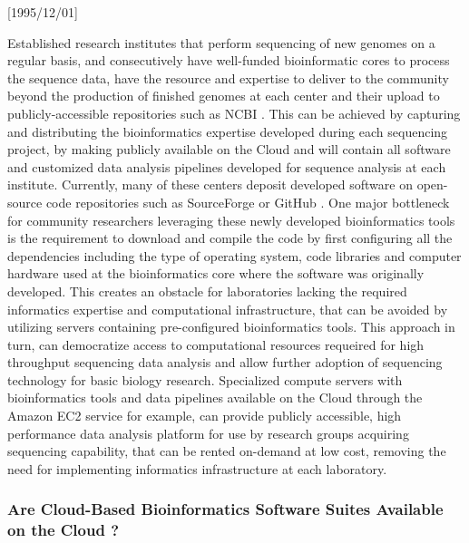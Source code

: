 \NeedsTeXFormat{LaTeX2e}[1995/12/01] \documentclass[10pt]{bmc_article}
\newenvironment{bmcformat}{\begin{raggedright}\baselineskip20pt\sloppy\setboolean{publ}{false}}{\end{raggedright}\baselineskip20pt\sloppy}
\begin{document}
\begin{bmcformat}
Established research institutes that perform sequencing of new genomes on a regular basis, and consecutively have
well-funded bioinformatic cores to process the sequence data, have the resource and expertise to deliver to the community 
beyond the production of finished genomes at each center and their upload to publicly-accessible repositories such as 
NCBI \cite{Pruitt2009}. This can be achieved by capturing and distributing the bioinformatics expertise developed during each
sequencing project, by making publicly available on the Cloud and will contain all software and customized data analysis
pipelines developed for sequence analysis at each institute. Currently, many of these centers deposit developed 
software on open-source code repositories such as SourceForge \cite{sourceforge} or GitHub \cite{github}. One major 
bottleneck for community researchers leveraging these newly developed bioinformatics tools is the requirement to 
download and compile the code by first configuring all the dependencies including the type of operating system, code 
libraries and computer hardware used at the bioinformatics core where the software was originally developed. This 
creates an obstacle for laboratories lacking the required informatics expertise and computational infrastructure, 
that can be avoided by utilizing servers containing pre-configured bioinformatics tools. This approach in turn, can 
democratize access to computational resources requeired for high throughput sequencing data analysis and allow further 
adoption of sequencing technology for basic biology research. Specialized compute servers with bioinformatics tools 
and data pipelines available on the Cloud through the Amazon EC2 service for example, can provide publicly accessible, 
high performance data analysis platform for use by research groups acquiring sequencing capability, that can be rented 
on-demand at low cost, removing the need for implementing informatics infrastructure at each laboratory.  


\subsubsection*{Are Cloud-Based Bioinformatics Software Suites Available on the Cloud ?}
  

\end{bmcformat}
\end{document}
